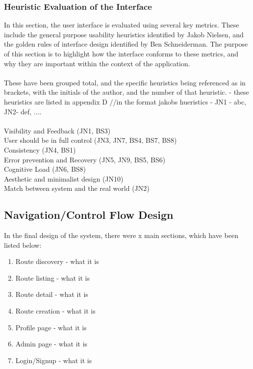 \subsubsection{Heuristic Evaluation of the Interface}
In this section, the user interface is evaluated using several key metrics. These include the general purpose usability heuristics identified by Jakob Nielsen\cite{nielsen199510}, and the golden rules of interface design identified by Ben Schneiderman\cite{shneiderman2005designing}. The purpose of this section is to highlight how the interface conforms to these metrics, and why they are important within the context of the application.\ \\
\ \\
{\color{red}
	These have been grouped total, and the specific heuristics being referenced as in brackets, with the initials of the author, and the number of that heuristic. - these heuristics are listed in appendix D
	//in the format jakobs hueristics - JN1 - abc, JN2- def, ....
	 \ \\
	\ \\
Visibility and Feedback (JN1, BS3)\ \\
User should be in full control (JN3, JN7, BS4, BS7, BS8)\ \\
Consistency (JN4, BS1)\ \\
Error prevention and Recovery (JN5, JN9, BS5, BS6)\ \\
Cognitive Load (JN6, BS8)\ \\
Aesthetic and minimalist design (JN10)\ \\
Match between system and the real world (JN2)\ \\
}


\subsection{Navigation/Control Flow Design}

{\color{blue}



In the final design of the system, there were x main sections, which have been listed below:
\begin{enumerate}
	\item Route discovery - what it is
	\item Route listing  - what it is
	\item Route detail - what it is
	\item Route creation - what it is
	\item Profile page - what it is
	\item Admin page - what it is
	\item Login/Signup - what it is
\end{enumerate}
}

